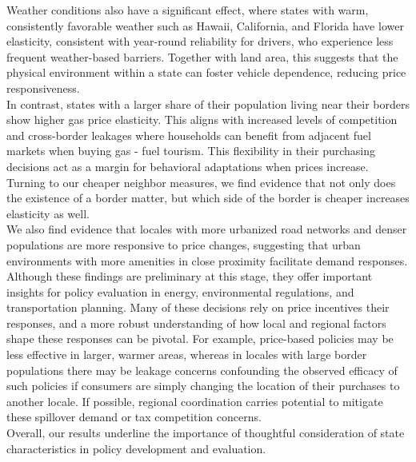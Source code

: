\documentclass[12pt,a4paper]{article}
\begin{document}
Weather conditions also have a significant effect, where states with warm, consistently favorable weather such as Hawaii, California, and Florida have lower elasticity, consistent with year-round reliability for drivers, who experience less frequent weather-based barriers. Together with land area, this suggests that the physical environment within a state can foster vehicle dependence, reducing price responsiveness. \\ 

In contrast, states with a larger share of their population living near their borders show higher gas price elasticity. This aligns with increased levels of competition and cross-border leakages where households can benefit from adjacent fuel markets when buying gas - fuel tourism. This flexibility in their purchasing decisions act as a margin for behavioral adaptations when prices increase. Turning to our cheaper neighbor measures, we find evidence that not only does the existence of a border matter, but which side of the border is cheaper increases elasticity as well. \\

We also find evidence that locales with more urbanized road networks and denser populations are more responsive to price changes, suggesting that urban environments with more amenities in close proximity facilitate demand responses. \\

Although these findings are preliminary at this stage, they offer important insights for policy evaluation in energy, environmental regulations, and transportation planning. Many of these decisions rely on price incentives their responses, and a more robust understanding of how local and regional factors shape these responses can be pivotal. For example, price-based policies may be less effective in larger, warmer areas, whereas in locales with large border populations there may be leakage concerns confounding the observed efficacy of such policies if consumers are simply changing the location of their purchases to another locale. If possible, regional coordination carries potential to mitigate these spillover demand or tax competition concerns. \\ 

Overall, our results underline the importance of thoughtful consideration of state characteristics in policy development and evaluation. 

\end{document}
